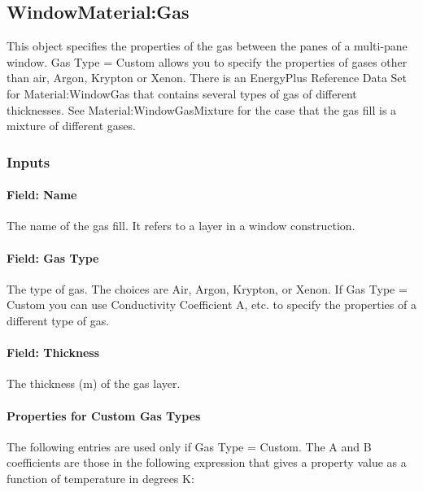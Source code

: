 \subsection{WindowMaterial:Gas}\label{windowmaterialgas}

This object specifies the properties of the gas between the panes of a multi-pane window. Gas Type = Custom allows you to specify the properties of gases other than air, Argon, Krypton or Xenon. There is an EnergyPlus Reference Data Set for Material:WindowGas that contains several types of gas of different thicknesses. See Material:WindowGasMixture for the case that the gas fill is a mixture of different gases.

\subsubsection{Inputs}\label{inputs-16-011}

\paragraph{Field: Name}\label{field-name-10-016}

The name of the gas fill. It refers to a layer in a window construction.

\paragraph{Field: Gas Type}\label{field-gas-type}

The type of gas. The choices are Air, Argon, Krypton, or Xenon. If Gas Type = Custom you can use Conductivity Coefficient A, etc. to specify the properties of a different type of gas.

\paragraph{Field: Thickness}\label{field-thickness-3}

The thickness (m) of the gas layer.

\paragraph{Properties for Custom Gas Types}\label{properties-for-custom-gas-types}

The following entries are used only if Gas Type = Custom. The A and B coefficients are those in the following expression that gives a property value as a function of temperature in degrees K:


